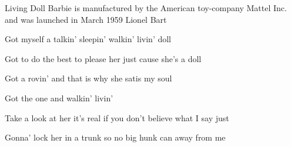 \begin{SBSong}{Living Doll}
  {Barbie is manufactured by the American toy-company Mattel Inc. and was launched in March 1959}
  {Lionel Bart}
  \begin{SBChorus}
    Got myself a  talkin' sleepin' walkin' livin' doll
    
    Got to do the best to please her just cause she's a  doll
    
    Got a rovin'  and that is why she satis my soul
    
    Got the one and  walkin'  livin'  
  \end{SBChorus}
  \begin{SBVerse}
    Take a look at her  it's real if you don't believe what I say just 
    
    Gonna' lock her  in a trunk so no big hunk can   away from me
  \end{SBVerse}
\end{SBSong}
